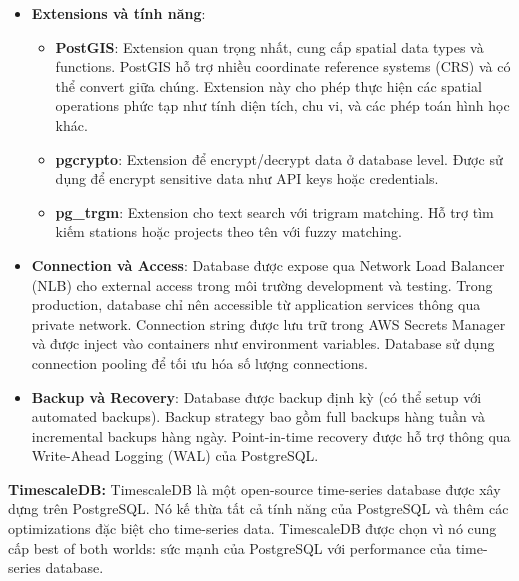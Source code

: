\begin{itemize}
    \item \textbf{Extensions và tính năng}:
        \begin{itemize}
            \item \textbf{PostGIS}: Extension quan trọng nhất, cung cấp spatial data types và functions. PostGIS hỗ trợ nhiều coordinate reference systems (CRS) và có thể convert giữa chúng. Extension này cho phép thực hiện các spatial operations phức tạp như tính diện tích, chu vi, và các phép toán hình học khác.
            
            \item \textbf{pgcrypto}: Extension để encrypt/decrypt data ở database level. Được sử dụng để encrypt sensitive data như API keys hoặc credentials.
            
            \item \textbf{pg\_trgm}: Extension cho text search với trigram matching. Hỗ trợ tìm kiếm stations hoặc projects theo tên với fuzzy matching.
        \end{itemize}
    
    \item \textbf{Connection và Access}: Database được expose qua Network Load Balancer (NLB) cho external access trong môi trường development và testing. Trong production, database chỉ nên accessible từ application services thông qua private network. Connection string được lưu trữ trong AWS Secrets Manager và được inject vào containers như environment variables. Database sử dụng connection pooling để tối ưu hóa số lượng connections.
    
    \item \textbf{Backup và Recovery}: Database được backup định kỳ (có thể setup với automated backups). Backup strategy bao gồm full backups hàng tuần và incremental backups hàng ngày. Point-in-time recovery được hỗ trợ thông qua Write-Ahead Logging (WAL) của PostgreSQL.
\end{itemize}

\textbf{TimescaleDB:} TimescaleDB là một open-source time-series database được xây dựng trên PostgreSQL. Nó kế thừa tất cả tính năng của PostgreSQL và thêm các optimizations đặc biệt cho time-series data. TimescaleDB được chọn vì nó cung cấp best of both worlds: sức mạnh của PostgreSQL với performance của time-series database.

